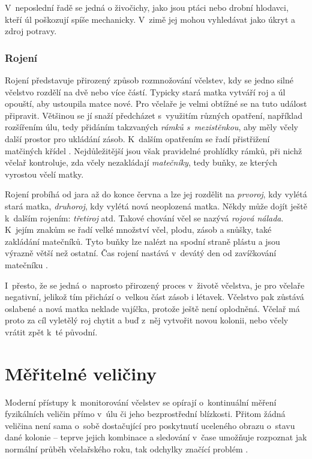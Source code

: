 V~neposlední řadě se jedná o živočichy, jako jsou ptáci nebo drobní hlodavci, kteří úl poškozují spíše mechanicky. V~zimě jej mohou vyhledávat jako úkryt a zdroj potravy.

\subsubsection*{Rojení}
Rojení představuje přirozený způsob rozmnožování včelstev, kdy se jedno silné včelstvo rozdělí na dvě nebo více částí. Typicky stará matka vytváří roj a úl opouští, aby ustoupila matce nové. Pro včelaře je velmi obtížné se na tuto událost připravit. Většinou se jí snaží předcházet s~využitím různých opatření, například rozšířením úlu, tedy přidáním takzvaných \textit{rámků s~mezistěnkou}, aby měly včely další prostor pro ukládání zásob. K~dalším opatřením se řadí přistřižení matčiných křídel \cite{ivcelarstviRojeni}. Nejdůležitější jsou však pravidelné prohlídky rámků, při nichž včelař kontroluje, zda včely nezakládají \textit{matečníky}, tedy buňky, ze kterých vyrostou včelí matky.

Rojení probíhá od jara až do konce června a lze jej rozdělit na \textit{prvoroj}, kdy vylétá stará matka, \textit{druhoroj}, kdy vylétá nová neoplozená matka. Někdy může dojít ještě k~dalším rojením: \textit{třetiroj} atd. Takové chování včel se nazývá \textit{rojová nálada}. K~jejím znakům se řadí velké množství včel, plodu, zásob a snůšky, také zakládání matečníků. Tyto buňky lze nalézt na spodní straně plástu a jsou výrazně větší než ostatní. Čas rojení nastává v~devátý den od zavíčkování matečníku \cite{Gerstmeier}.

I~přesto, že se jedná o~naprosto přirozený proces v~životě včelstva, je pro včelaře negativní, jelikož tím přichází o~velkou část zásob i létavek. Včelstvo pak zůstává oslabené a nová matka neklade vajíčka, protože ještě není oplodněná. Včelař má proto za cíl vyletělý roj chytit a buď z~něj vytvořit novou kolonii, nebo včely vrátit zpět k~té původní.

\section{Měřitelné veličiny} \label{sec:veliciny}
Moderní přístupy k~monitorování včelstev se opírají o~kontinuální měření fyzikálních veličin přímo v~úlu či jeho bezprostřední blízkosti. Přitom žádná veličina není sama o~sobě dostačující pro poskytnutí uceleného obrazu o~stavu dané kolonie -- teprve jejich kombinace a sledování v~čase umožňuje rozpoznat jak normální průběh včelařského roku, tak odchylky značící problém \cite{Cecchi}.

